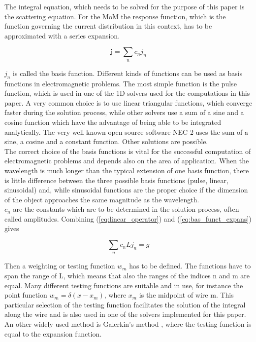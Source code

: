 \documentclass[two-column,ras]{agutex}
\begin{document}
\begin{article}
The integral equation, which needs to be solved for the purpose of this paper is the scattering equation. For the MoM the response function, which is the function governing the current distribution in this context, has to be approximated with a series expansion.

\begin{equation}\label{eq:bas_funct_expans}
 \mathbf{j}=\sum_{n} c_n j_n
\end{equation}

$j_n$ is called the basis function. Different kinds of functions can be used as basis functions in electromagnetic problems. The most simple function is the pulse function, which is used in one of the 1D solvers used for the computations in this paper. A very common choice is to use linear triangular functions, which converge faster during the solution process, while other solvers use a sum of a sine and a cosine function which have the advantage of being able to be integrated analytically. The very well known open source software NEC 2 uses the sum of a sine, a cosine and a constant function. Other solutions are possible.\\

The correct choice of the basis functions is vital for the successful computation of electromagnetic problems and depends also on the area of application. When the wavelength is much longer than the typical extension of one basis function, there is little difference between the three possible basis functions (pulse, linear, sinusoidal) and, while sinusoidal functions are the proper choice if the dimension of the object approaches the same magnitude as the wavelength.\\

$c_n$ are the constants which are to be determined in the solution process, often called amplitudes. Combining (\ref{eq:linear_operator}) and (\ref{eq:bas_funct_expans}) gives

\begin{equation}\label{eq:expanded_func}
 \sum_{n} c_n L j_n=g
\end{equation}

Then a weighting or testing function $w_m$ has to be defined. The functions have to span the range of L, which means that also the ranges of the indices n and m are equal. Many different testing functions are suitable and in use, for instance the point function $w_m=\delta(x-x_m)$, where $x_m$ is the midpoint of wire m. This particular selection of the testing function facilitates the solution of the integral along the wire and is also used in one of the solvers implemented for this paper. An other widely used method is Galerkin's method \cite{harrington}, where the testing function is equal to the expansion function.\\



\end{article}
\end{document}
